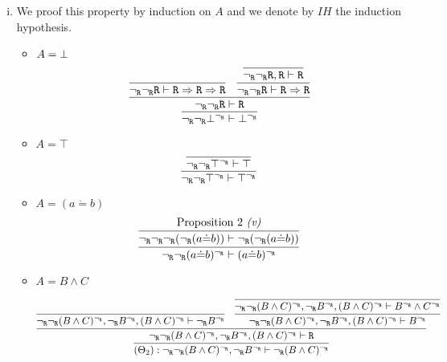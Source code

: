 \begin{enumerate}[(i)]
    \item We proof this property by induction on $A$ and we denote by $IH$ the induction hypothesis.
    \begin{itemize}
        \item $A=\bot$
            $$
                \infer{
                    \ngr\ngr \bottom^\ngr \vdash \bottom^\ngr
                }{
                    \infer{
                        \ngr\ngr \R \vdash \R
                    }{
                        \infer{
                            \ngr\ngr \R \vdash \R\Rightarrow\R\Rightarrow\R
                        }{
                        }&
                        \infer{
                            \ngr\ngr \R \vdash \R\Rightarrow\R
                        }{
                            \infer{
                                \ngr\ngr \R, \R \vdash \R
                            }{
                            }
                        }
                    }
                }
            $$
        \item $A=\top$
            $$
                \infer{
                    \ngr\ngr \top^\ngr \vdash \top^\ngr
                }{
                    \infer{
                        \ngr\ngr \top^\ngr \vdash \top
                    }{
                    }
                }
            $$
        \item $A=(a \dot{=} b)$
            $$
                \infer{
                    \ngr\ngr(a \dot{=} b)^\ngr \vdash (a \dot{=} b)^\ngr
                }{
                    \infer{
                        \ngr\ngr\ngr(\ngr(a \dot{=} b)) \vdash \ngr(\ngr(a \dot{=} b))
                    }{
                        \text{Proposition 2 \textit{(v)}}
                    }
                }
            $$
        \item $A=B\wedge C$
        
            $$
            \infer{
                            (\Theta_2) : \ngr\ngr(B \wedge C)^\ngr, \ngr B^\ngr \vdash \ngr(B \wedge C)^\ngr
                        }{
                            \infer{
                                \ngr\ngr(B \wedge C)^\ngr, \ngr B^\ngr, (B \wedge C)^\ngr \vdash \R
                            }{
                                \infer{
                                    \ngr\ngr(B \wedge C)^\ngr, \ngr B^\ngr, (B \wedge C)^\ngr \vdash \ngr B^\ngr
                                }{
                                }&
                                \infer{
                                    \ngr\ngr(B \wedge C)^\ngr, \ngr B^\ngr, (B \wedge C)^\ngr \vdash B^\ngr
                                }{
                                    \infer{
                                        \ngr\ngr(B \wedge C)^\ngr, \ngr B^\ngr, (B \wedge C)^\ngr \vdash B^\ngr \wedge C^\ngr
                                    }{
                                    }
                                }
                            }
                        }
            $$        
        

\end{itemize}
\end{enumerate}
